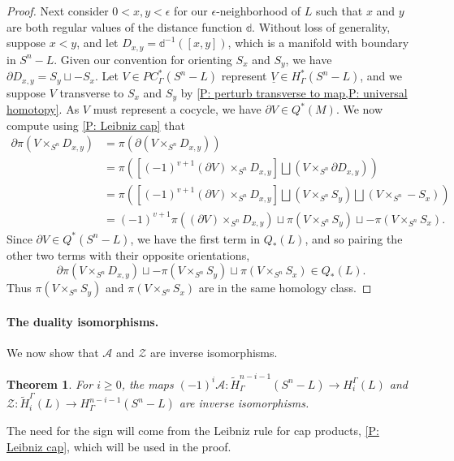 \documentclass[12pt]{article}
\theoremstyle{plain}
\newtheorem{theorem}{Theorem}[section]
\theoremstyle{definition}
\theoremstyle{remark}
\newcommand{\uV}{\underline{V}}
\newcommand{\td}[1]{\tilde{#1}}
\newcommand{\bd}{\partial}
\newcommand{\mc}[1]{\mathcal{#1}}
\begin{document}
\begin{proof}
Next consider $0 < x, y < \epsilon$ for our $\epsilon$-neighborhood of $L$ such that $x$ and $y$ are both regular values of the distance function $\mathbb d$.
Without loss of generality, suppose $x < y$, and let $D_{x,y} = \mathbb d^{-1}([x,y])$, which is a manifold with boundary in $S^n-L$.
Given our convention for orienting $S_x$ and $S_y$, we have $\bd D_{x,y} = S_y \sqcup -S_x$.
Let $V \in PC^*_\Gamma(S^n-L)$ represent $\uV \in H^*_\Gamma(S^n - L)$, and we suppose $V$ transverse to $S_x$ and $S_y$ by \cref{P: perturb transverse to map,P: universal homotopy}.
As $V$ must represent a cocycle, we have $\bd V \in Q^*(M)$.
We now compute using \cref{P: Leibniz cap} that
\begin{align*}
\bd \pi(V \times_{S^n} D_{x,y}) &= \pi(\bd (V \times_{S^n} D_{x,y}))\\
&= \pi\left(\left[(-1)^{v+1} (\bd V) \times_{S^n}D_{x,y} \right] \bigsqcup (V \times_{S^n} \bd D_{x,y})\right)\\
&= \pi\left(\left[(-1)^{v+1} (\bd V) \times_{S^n}D_{x,y} \right] \bigsqcup (V \times_{S^n} S_y)\bigsqcup (V \times_{S^n} -S_x)\right)\\
&=(-1)^{v+1} \pi((\bd V) \times_{S^n}D_{x,y}) \sqcup \pi(V \times_{S^n} S_y) \sqcup -\pi(V \times_{S^n} S_x).
\end{align*}
Since $\bd V \in Q^*(S^n-L)$, we have the first term in $Q_*(L)$, and so pairing the other two terms with their opposite orientations,
$$\bd \pi(V \times_{S^n} D_{x,y})\sqcup -\pi(V \times_{S^n} S_y) \sqcup \pi(V \times_{S^n} S_x) \in Q_*(L).$$
Thus $\pi(V \times_{S^n} S_y)$ and $\pi(V \times_{S^n} S_x)$ are in the same homology class.
\end{proof}


\paragraph{The duality isomorphisms.} We now show that $\mc A$ and $\mc Z$ are inverse isomorphisms.

\begin{theorem}\label{T: alex duality}
For $i \geq 0$, the maps  $(-1)^{i}\mc A \colon \td H^{n-i-1}_\Gamma(S^n-L) \to H_i^\Gamma(L)$ and $\mc Z \colon \td H_i^\Gamma(L) \to H^{n-i-1}_\Gamma(S^n-L)$ are inverse isomorphisms.
\end{theorem}
The need for the sign will come from the Leibniz rule for cap products, \cref{P: Leibniz cap}, which will be used in the proof.
\end{document}
